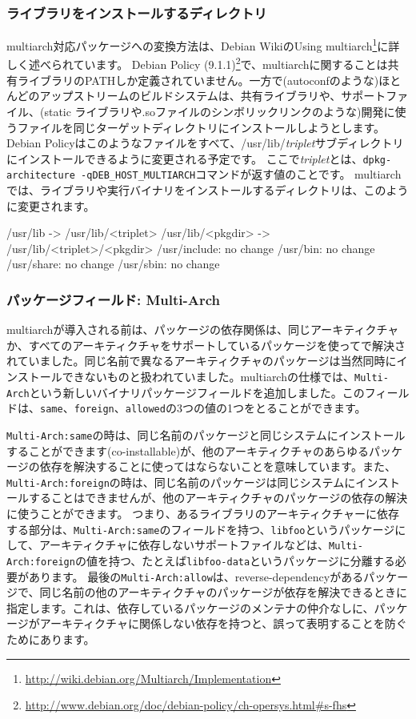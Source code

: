 \documentclass[mingoth,a4paper]{jsarticle}
\begin{document}
\subsubsection{ライブラリをインストールするディレクトリ}
multiarch対応パッケージへの変換方法は、Debian WikiのUsing multiarch\footnote{\url{http://wiki.debian.org/Multiarch/Implementation}}に詳しく述べられています。
Debian Policy (9.1.1)\footnote{\url{http://www.debian.org/doc/debian-policy/ch-opersys.html\#s-fhs}}で、multiarchに関することは共有ライブラリのPATHしか定義されていません。一方で(autoconfのような)ほとんどのアップストリームのビルドシステムは、共有ライブラリや、サポートファイル、(static ライブラリや.soファイルのシンボリックリンクのような)開発に使うファイルを同じターゲットディレクトリにインストールしようとします。Debian Policyはこのようなファイルをすべて、/usr/lib/{\it triplet}サブディレクトリにインストールできるように変更される予定です。
ここで{\it triplet}とは、{\tt dpkg-architecture -qDEB\_HOST\_MULTIARCH}コマンドが返す値のことです。
multiarchでは、ライブラリや実行バイナリをインストールするディレクトリは、このように変更されます。
\begin{commandline}
/usr/lib -> /usr/lib/<triplet>
/usr/lib/<pkgdir> -> /usr/lib/<triplet>/<pkgdir>
/usr/include: no change
/usr/bin: no change
/usr/share: no change
/usr/sbin: no change
\end{commandline}

\subsubsection{パッケージフィールド: Multi-Arch}
multiarchが導入される前は、パッケージの依存関係は、同じアーキティクチャか、すべてのアーキティクチャをサポートしているパッケージを使ってで解決されていました。同じ名前で異なるアーキティクチャのパッケージは当然同時にインストールできないものと扱われていました。multiarchの仕様では、{\tt Multi-Arch}という新しいバイナリパッケージフィールドを追加しました。このフィールドは、{\tt same}、{\tt foreign}、{\tt allowed}の3つの値の1つをとることができます。

{\tt Multi-Arch:same}の時は、同じ名前のパッケージと同じシステムにインストールすることができます(co-installable)が、他のアーキティクチャのあらゆるパッケージの依存を解決することに使ってはならないことを意味しています。また、{\tt Multi-Arch:foreign}の時は、同じ名前のパッケージは同じシステムにインストールすることはできませんが、他のアーキティクチャのパッケージの依存の解決に使うことができます。
つまり、あるライブラリのアーキティクチャーに依存する部分は、{\tt Multi-Arch:same}のフィールドを持つ、{\tt libfoo}というパッケージにして、アーキティクチャに依存しないサポートファイルなどは、{\tt Multi-Arch:foreign}の値を持つ、たとえば{\tt libfoo-data}というパッケージに分離する必要があります。
最後の{\tt Multi-Arch:allow}は、reverse-dependencyがあるパッケージで、同じ名前の他のアーキティクチャのパッケージが依存を解決できるときに指定します。これは、依存しているパッケージのメンテナの仲介なしに、パッケージがアーキティクチャに関係しない依存を持つと、誤って表明することを防ぐためにあります。
\end{document}

